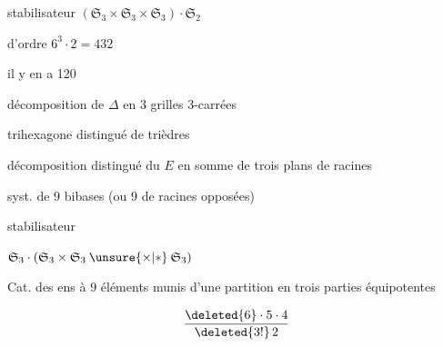stabilisateur $(\mathfrak S_3\times\mathfrak S_3\times\mathfrak S_3)\cdot\mathfrak S_2$

d'ordre $6^3\cdot2=432$

il y en a 120

décomposition de $\Delta$ en 3 grilles 3-carrées

trihexagone distingué de trièdres 

décomposition  distingué du $E$ en somme  de trois plans de racines

syst.  de 9 bibases (ou 9  de racines opposées)

stabilisateur

$\mathfrak S_3\cdot(\mathfrak S_3\times\mathfrak S_3\mathbin{\unsure{\times|*}}\mathfrak S_3)$

Cat. des ens à 9 éléments munis d'une partition en trois parties équipotentes

\[
 \frac{\deleted{6}\cdot5\cdot4}{\deleted{3!}\,2}
\]

